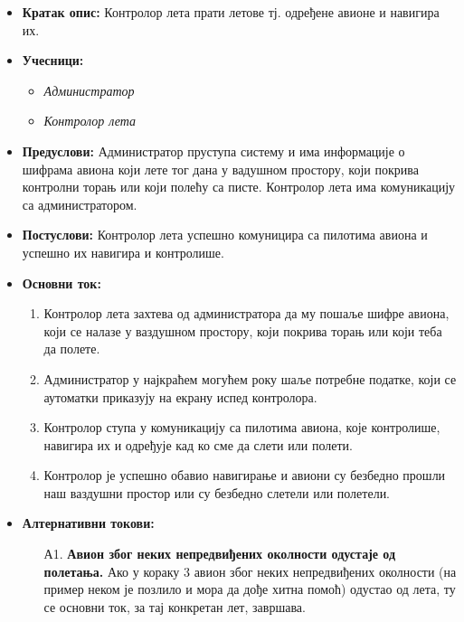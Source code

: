 \documentclass{article}
\begin{document}
\begin{itemize}
    \item \textbf{Кратак опис:} Контролор лета прати летове тј. одређене авионе и навигира их.
    \item \textbf{Учесници:}
        \begin{itemize}
            \item \textit{Администратор}
            \item \textit{Контролор лета}
        \end{itemize}
    \item \textbf{Предуслови:} Администратор пруступа систему и има информације о шифрама авиона који лете тог дана у вадушном простору, који покрива контролни торањ или који полећу са писте. Контролор лета има комуникацију са администратором. 
    \item \textbf{Постуслови:} Контролор лета успешно комуницира са пилотима авиона и успешно их навигира и контролише.
    \item \textbf{Основни ток:}
        \begin{enumerate}
            \item Контролор лета захтева од администратора да му пошаље шифре авиона, који се налазе у ваздушном простору, који покрива торањ или који теба да полете.
            \item Администратор у најкраћем могућем року шаље потребне податке, који се аутоматки приказују на екрану испед контролора.
            \item Контролор ступа у комуникацију са пилотима авиона, које контролише, навигира их и одређује кад ко сме да слети или полети.
            \item Контролор је успешно обавио навигирање и авиони су безбедно прошли наш ваздушни простор или су безбедно слетели или полетели.
        \end{enumerate}
    
    \item \textbf{Алтернативни токови:}
        \begin{itemize}
            \item[А1.] \textbf{Авион због неких непредвиђених околности одустаје од полетања.} Ако у кораку 3 авион због неких непредвиђених околности (на пример неком је позлило и мора да дође хитна помоћ) одустао од лета, ту се основни ток, за тај конкретан лет, завршава. 
        \end{itemize}
\end{itemize}
\end{document}
